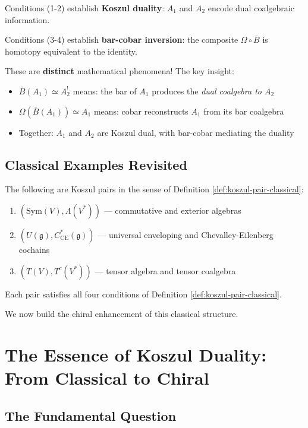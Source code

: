 \begin{remark}
\label{rem:two-phenomena}
Conditions (1-2) establish \textbf{Koszul duality}: $A_1$ and $A_2$ encode dual coalgebraic information.

Conditions (3-4) establish \textbf{bar-cobar inversion}: the composite $\Omega \circ \bar{B}$ is homotopy equivalent to the identity.

These are \textbf{distinct} mathematical phenomena! The key insight:
\begin{itemize}
\item $\bar{B}(A_1) \simeq A_2^!$ means: the bar of $A_1$ produces the \emph{dual coalgebra to $A_2$}
\item $\Omega(\bar{B}(A_1)) \simeq A_1$ means: cobar reconstructs $A_1$ from its bar coalgebra
\item Together: $A_1$ and $A_2$ are Koszul dual, with bar-cobar mediating the duality
\end{itemize}
\end{remark}

\subsection{Classical Examples Revisited}

\begin{theorem}
The following are Koszul pairs in the sense of Definition \ref{def:koszul-pair-classical}:
\begin{enumerate}
\item $(\text{Sym}(V), \Lambda(V^*))$ — commutative and exterior algebras
\item $(U(\mathfrak{g}), C^*_{\text{CE}}(\mathfrak{g}))$ — universal enveloping and Chevalley-Eilenberg cochains
\item $(T(V), T^c(V^*))$ — tensor algebra and tensor coalgebra
\end{enumerate}
Each pair satisfies all four conditions of Definition \ref{def:koszul-pair-classical}.
\end{theorem}

We now build the chiral enhancement of this classical structure.

\section{The Essence of Koszul Duality: From Classical to Chiral}
\label{sec:essence-koszul-duality}

\subsection{The Fundamental Question}

